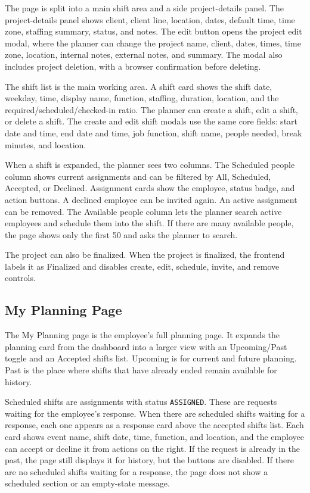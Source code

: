 \documentclass[11pt]{article}
\newcommand{\code}[1]{\nolinkurl{#1}}
\begin{document}
The page is split into a main shift area and a side project-details panel. The project-details panel shows client, client line, location, dates, default time, time zone, staffing summary, status, and notes. The edit button opens the project edit modal, where the planner can change the project name, client, dates, times, time zone, location, internal notes, external notes, and summary. The modal also includes project deletion, with a browser confirmation before deleting.

The shift list is the main working area. A shift card shows the shift date, weekday, time, display name, function, staffing, duration, location, and the required/scheduled/checked-in ratio. The planner can create a shift, edit a shift, or delete a shift. The create and edit shift modals use the same core fields: start date and time, end date and time, job function, shift name, people needed, break minutes, and location.

When a shift is expanded, the planner sees two columns. The Scheduled people column shows current assignments and can be filtered by All, Scheduled, Accepted, or Declined. Assignment cards show the employee, status badge, and action buttons. A declined employee can be invited again. An active assignment can be removed. The Available people column lets the planner search active employees and schedule them into the shift. If there are many available people, the page shows only the first 50 and asks the planner to search.

The project can also be finalized. When the project is finalized, the frontend labels it as Finalized and disables create, edit, schedule, invite, and remove controls.

\subsection{My Planning Page}

The My Planning page is the employee's full planning page. It expands the planning card from the dashboard into a larger view with an Upcoming/Past toggle and an Accepted shifts list. Upcoming is for current and future planning. Past is the place where shifts that have already ended remain available for history.

Scheduled shifts are assignments with status \code{ASSIGNED}. These are requests waiting for the employee's response. When there are scheduled shifts waiting for a response, each one appears as a response card above the accepted shifts list. Each card shows event name, shift date, time, function, and location, and the employee can accept or decline it from actions on the right. If the request is already in the past, the page still displays it for history, but the buttons are disabled. If there are no scheduled shifts waiting for a response, the page does not show a scheduled section or an empty-state message.
\end{document}
